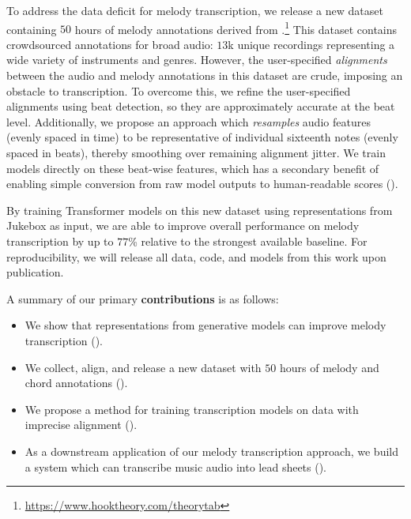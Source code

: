 To address the data deficit for melody transcription, 
we release a new dataset containing $50$ hours of melody annotations 
derived 
from \hooktheory.\footnote{\url{https://www.hooktheory.com/theorytab}} 
This dataset contains crowdsourced annotations for broad audio: 
$13$k unique recordings representing a wide variety of instruments and genres. 
However, the user-specified \emph{alignments} between the audio and melody annotations in this dataset are crude, imposing an obstacle to transcription. 
To overcome this, we refine the user-specified alignments using beat detection, so they are approximately accurate at the beat level. 
Additionally, we propose an approach which \emph{resamples} audio features (evenly spaced in time) to be representative of individual sixteenth notes (evenly spaced in beats), 
thereby smoothing over remaining alignment jitter. 
We train models directly on these beat-wise features, 
which has a secondary benefit of enabling simple conversion from raw model outputs to human-readable scores ().

By training Transformer models on this new dataset using representations from Jukebox as input, we are able to improve overall performance on melody transcription by 
up to $77$\% 
relative to the strongest available baseline. 
For reproducibility, we will release all data, code, and models from this work upon publication.


A summary of our primary \textbf{contributions} is as follows:
\begin{itemize}
    \item We show that representations from generative models can improve melody transcription ().
    \item We collect, align, and release a new dataset with $50$ hours of melody and chord annotations ().
    \item We propose a method for training transcription models on data with imprecise alignment ().
    \item As a downstream application of our melody transcription approach, we build a system which can transcribe music audio into lead sheets ().
\end{itemize}